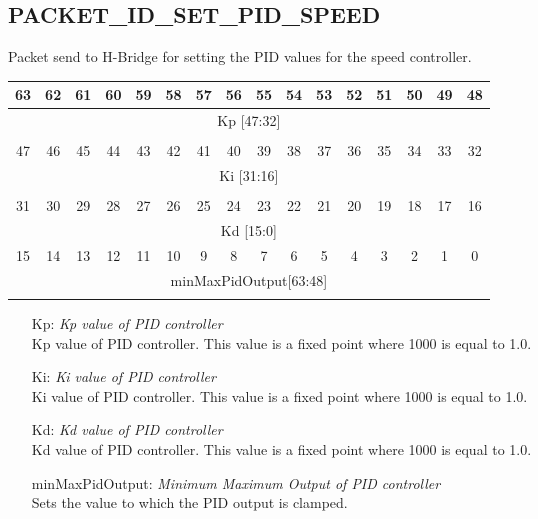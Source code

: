 \documentclass{article}
\begin{document}
\subsection{PACKET\_ID\_SET\_PID\_SPEED}
Packet send to H-Bridge for setting the PID values for the speed controller.
\begin{tabular} { c c c c c c c c c c c c c c c c}
  63&62&61&60&59&58&57&56&55&54&53&52&51&50&49&48\\
  \hline
  \multicolumn{16}{|c|}{Kp [47:32]} \\ 
  \hline
  \multicolumn{16}{c}{} \\
  47&46&45&44&43&42&41&40&39&38&37&36&35&34&33&32\\
  \hline
  \multicolumn{16}{|c|}{Ki [31:16]} \\ 
  \hline
  \multicolumn{16}{c}{} \\
  31&30&29&28&27&26&25&24&23&22&21&20&19&18&17&16\\
  \hline
  \multicolumn{16}{|c|}{Kd [15:0]} \\ 
  \hline
  \hline
  15&14&13&12&11&10&9&8&7&6&5&4&3&2&1&0\\
  \hline
  \multicolumn{16}{|c|}{ minMaxPidOutput[63:48]}\\ 
  \hline
  \multicolumn{16}{c}{} \\
\end{tabular}
\begin{itemize}
  \item[Kp: ] {\it Kp value of PID controller}\\
    Kp value of PID controller. This value is a fixed point where 1000
    is equal to 1.0.

  \item[Ki: ] {\it Ki value of PID controller}\\
    Ki value of PID controller. This value is a fixed point where 1000
    is equal to 1.0.

  \item[Kd: ] {\it Kd value of PID controller}\\
    Kd value of PID controller. This value is a fixed point where 1000
    is equal to 1.0.
  \item[minMaxPidOutput: ] {\it Minimum Maximum Output of PID controller}\\
    Sets the value to which the PID output is clamped.
\end{itemize}
\end{document}
